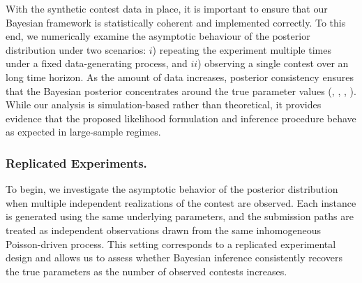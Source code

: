 \documentclass[mnsc]{informs3}
\begin{document}
With the synthetic contest data in place, it is important to ensure that our Bayesian framework is statistically coherent and implemented correctly. 
To this end, we numerically examine the asymptotic behaviour of the posterior distribution under two scenarios:
$i$) repeating the experiment multiple times under a fixed data-generating process, and $ii$) observing a single contest over an long time horizon.
As the amount of data increases, posterior consistency ensures that the Bayesian posterior concentrates around the true parameter values (\citealt{vaart1998asymptotic}, \citealt{ghosal2000convergence}, \citealt{pokern2013posterior}, \citealt{ramamoorthi2015posterior}).
While our analysis is simulation-based rather than theoretical, it provides evidence that the proposed likelihood formulation and inference procedure behave as expected in large-sample regimes.


\subsubsection{Replicated Experiments.}

To begin, we investigate the asymptotic behavior of the posterior distribution when multiple independent realizations of the contest are observed. 
Each instance is generated using the same underlying parameters, and the submission paths are treated as independent observations drawn from the same inhomogeneous Poisson-driven process. 
This setting corresponds to a replicated experimental design and allows us to assess whether Bayesian inference consistently recovers the true parameters as the number of observed contests increases.
\end{document}
